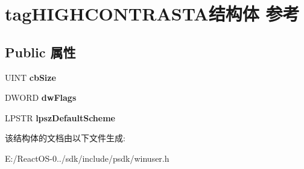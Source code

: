 \hypertarget{structtag_h_i_g_h_c_o_n_t_r_a_s_t_a}{}\section{tag\+H\+I\+G\+H\+C\+O\+N\+T\+R\+A\+S\+T\+A结构体 参考}
\label{structtag_h_i_g_h_c_o_n_t_r_a_s_t_a}
\subsection*{Public 属性}
\begin{DoxyCompactItemize}
\item 
\mbox{\label{structtag_h_i_g_h_c_o_n_t_r_a_s_t_a_a93109b300fda496ac059ab698e0700eb}} 
U\+I\+NT {\bfseries cb\+Size}
\item 
\mbox{\label{structtag_h_i_g_h_c_o_n_t_r_a_s_t_a_a03bdcdc571a1fee9700085abf0fb1f4f}} 
D\+W\+O\+RD {\bfseries dw\+Flags}
\item 
\mbox{\label{structtag_h_i_g_h_c_o_n_t_r_a_s_t_a_a17fe7cc6632194bdc4418c7545c7e8f8}} 
L\+P\+S\+TR {\bfseries lpsz\+Default\+Scheme}
\end{DoxyCompactItemize}


该结构体的文档由以下文件生成\+:\begin{DoxyCompactItemize}
\item 
E\+:/\+React\+O\+S-\/0../sdk/include/psdk/winuser.\+h\end{DoxyCompactItemize}
